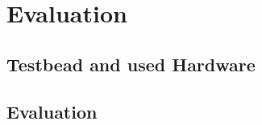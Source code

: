 \chapter{Evaluation} %

\label{Chapter5} %

\section{Testbead and used Hardware}

\section{Evaluation}